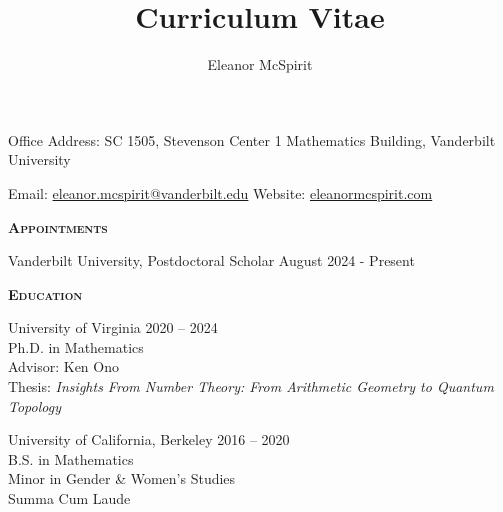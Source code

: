 \documentclass[11pt]{amsart}
\title{\large{Curriculum Vitae}}
\author{\large{Eleanor McSpirit}}
\theoremstyle{remark}
\begin{document}
\textbf{ }

\vspace{-.2in}

\maketitle 

\vspace{-.1in}

\large{Office Address: SC 1505, Stevenson Center 1 Mathematics Building, Vanderbilt University}

\large{Email: \href{eleanor.mcspirit@vanderbilt.edu}{eleanor.mcspirit@vanderbilt.edu} \hfill Website: \href{http://eleanormcspirit.com}{eleanormcspirit.com} 

\vspace{.1in}

\large{\textbf{\textsc{\textsc{Appointments}}}

Vanderbilt University, Postdoctoral Scholar \hfill August 2024 - Present

\vspace{.1in}

\large{\textbf{\textsc{\textsc{Education}}}

University of Virginia \hfill 2020 -- 2024 \\
Ph.D. in Mathematics\\ Advisor: Ken Ono \\
Thesis: \textit{Insights From Number Theory: From Arithmetic Geometry to Quantum Topology} \\

\vspace{-.1in}

University of California, Berkeley \hfill 2016 -- 2020 \\
B.S. in Mathematics\\ Minor in Gender \& Women's Studies \\
Summa Cum Laude


}}}
\end{document}
